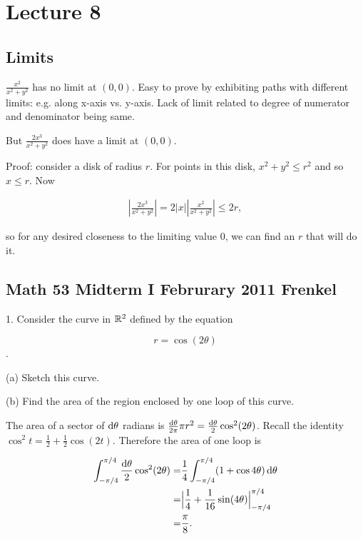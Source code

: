 \documentclass[12pt]{article}
\begin{document}
\section*{Lecture 8}

\subsection*{Limits}

$\frac{x^2}{x^2 + y^2}$ has no limit at $(0, 0)$.
Easy to prove by exhibiting paths with different limits: e.g. along x-axis vs. y-axis.
Lack of limit related to degree of numerator and denominator being same.

But $\frac{2x^3}{x^2 + y^2}$ does have a limit at $(0, 0)$.

Proof: consider a disk of radius $r$. For points in this disk, $x^2 + y^2 \leq r^2$ and so $x \leq r$.
Now

\begin{align*}
  \left|\frac{2x^3}{x^2 + y^2}\right| = 2|x|\left|\frac{x^2}{x^2 + y^2}\right| \leq 2r,
\end{align*}

so for any desired closeness to the limiting value 0, we can find an $r$ that will do it.



\newpage
\subsection*{Math 53 Midterm I Februrary 2011 Frenkel}

1. Consider the curve in $\mathbb{R}^2$ defined by the equation

$$
r = \cos(2\theta)
$$.

(a) Sketch this curve.

(b) Find the area of the region enclosed by one loop of this curve.\\

\begin{mdframed}
The area of a sector of $\operatorname{\text{d}\theta}$ radians is $\frac{\operatorname{\text{d}\theta}}{2\pi}\pi r^2 = \frac{\operatorname{\text{d}\theta}}{2}\cos^2(2\theta)$. Recall the identity $\cos^2 t = \frac{1}{2} + \frac{1}{2}\cos(2t)$. Therefore the area of one loop is

\begin{align*}
  \int_{-\pi/4}^{\pi/4} \frac{\operatorname{\text{d}\theta}}{2}\cos^2(2\theta)
  =&\frac{1}{4}\int_{-\pi/4}^{\pi/4} (1 + \cos 4\theta) \operatorname{\text{d}\theta} \\
  =& \Big|\frac{1}{4} + \frac{1}{16}\sin(4\theta)\Big|_{-\pi/4}^{\pi/4} \\
  =& \frac{\pi}{8}.
\end{align*}

\end{mdframed}~\\
\end{document}
